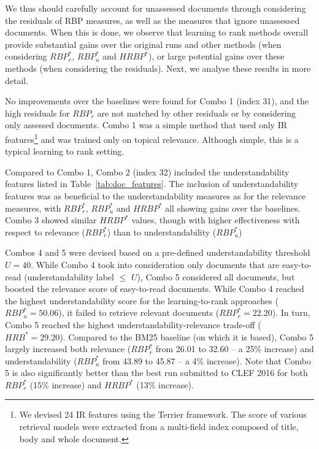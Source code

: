 
We thus should carefully account for unassessed documents through considering the residuals of RBP measures, as well as the measures that ignore unassessed documents. When this is done, we observe that learning to rank methods overall provide substantial gains over the original runs and other methods (when considering $RBP^*_r$, $RBP^*_u$ and $HRBP^*$), or large potential gains over these methods (when considering the residuals). Next, we analyse these results in more detail. 

No improvements over the baselines were found for Combo 1 (index 31), and the high residuals for $RBP_r$ are not matched by other residuals or by considering only assessed documents. Combo 1 was a simple method that used only IR features\footnote{We devised 24 IR features using the Terrier framework. The score of various retrieval models were extracted from a multi-field index composed of title, body and whole document.} and was trained only on topical relevance. Although simple, this is a typical learning to rank setting.

Compared to Combo 1, Combo 2 (index 32) included the understandability features listed in Table~\ref{tab:doc_features}. The inclusion of understandability features was as beneficial to the understandability measures as for the relevance measures, with $RBP_r^*$, $RBP_u^*$ and $HRBP^*$ all showing gains over the baselines. Combo 3 showed similar $HRBP^*$ values, though with higher effectiveness with respect to relevance ($RBP_r^*$) than to understandability ($RBP_u^*$)


Combos 4 and 5 were devised based on a pre-defined understandability threshold $U=40$. While Combo 4 took into consideration only documents that are easy-to-read (understandability label $\le$ $U$), Combo 5 considered all documents, but boosted the relevance score of easy-to-read documents. While Combo 4 reached the highest understandability score for the learning-to-rank approaches ($RBP_u^{*}=50.06$), it failed to retrieve relevant documents ($RBP_r^{*}=22.20$). In turn, Combo 5 reached the highest understandability-relevance trade-off ($HRB^{*}=29.20$). Compared to the BM25 baseline (on which it is based), Combo 5  largely increased both relevance ($RBP_r^*$ from 26.01 to 32.60 -- a 25\% increase) and understandability ($RBP_u^*$ from 43.89 to 45.87 -- a 4\% increase). Note that Combo 5 is also significantly better than the best run submitted to CLEF 2016 for both $RBP_r^{*}$ (15\% increase) and $HRBP^{*}$ (13\% increase).


